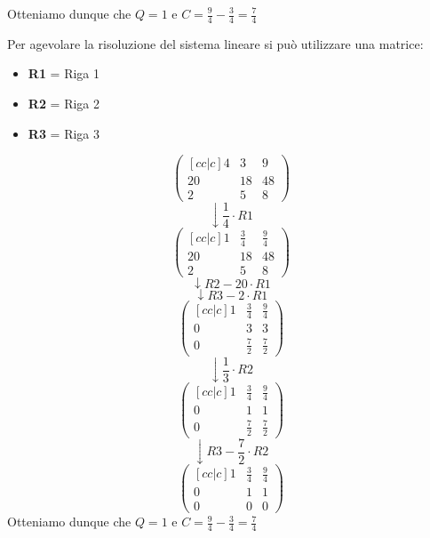 \documentclass[a4paper]{article}
\theoremstyle{break}
\theoremstyle{break}
\theoremstyle{break}
\theoremstyle{break}
\begin{document}
\begin{example}
  \noindent Otteniamo dunque che \( Q = 1 \) e \( C = \frac{9}{4} - \frac{3}{4} = \frac{7}{4} \)

  \vspace{0.5cm}

  \noindent Per agevolare la risoluzione del sistema lineare si può utilizzare una matrice:
  \begin{itemize}
    \item \textbf{R1} = Riga 1
    \item \textbf{R2} = Riga 2
    \item \textbf{R3} = Riga 3
  \end{itemize}
  \[
    \begin{pmatrix}[cc|c]
      4  & 3  & 9  \\
      20 & 18 & 48 \\
      2  & 5  & 8
    \end{pmatrix}
  \]
  \[\downarrow \frac{1}{4} \cdot R1 \]
  \[
    \begin{pmatrix}[cc|c]
      1  & \frac{3}{4} & \frac{9}{4} \\
      20 & 18          & 48          \\
      2  & 5           & 8
    \end{pmatrix}
  \]
  \[
    \downarrow R2 - 20 \cdot R1
  \]
  \[
    \downarrow R3 - 2 \cdot R1
  \]
  \[
    \begin{pmatrix} [cc|c]
      1 & \frac{3}{4} & \frac{9}{4} \\
      0 & 3           & 3           \\
      0 & \frac{7}{2} & \frac{7}{2}
    \end{pmatrix}
  \]
  \[
    \downarrow \frac{1}{3} \cdot R2
  \]
  \[
    \begin{pmatrix}[cc|c]
      1 & \frac{3}{4} & \frac{9}{4} \\
      0 & 1           & 1           \\
      0 & \frac{7}{2} & \frac{7}{2}
    \end{pmatrix}
  \]
  \[
    \downarrow R3 - \frac{7}{2} \cdot R2
  \]
  \[
    \begin{pmatrix}[cc|c]
      1 & \frac{3}{4} & \frac{9}{4} \\
      0 & 1           & 1           \\
      0 & 0           & 0
    \end{pmatrix}
  \]
  \noindent Otteniamo dunque che \( Q = 1 \) e \( C = \frac{9}{4} - \frac{3}{4} = \frac{7}{4} \)
\end{example}
\end{document}
